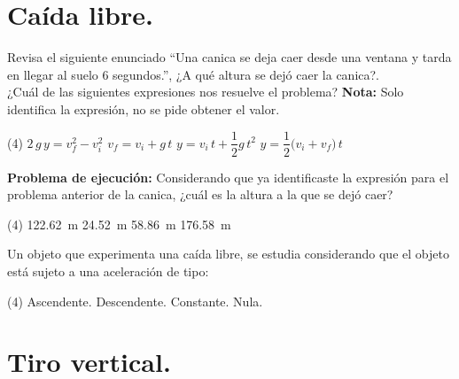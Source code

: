 \documentclass[12pt, letter]{exam}
\begin{document}
\begin{questions}
    \section{Caída libre.}
    
    \question Revisa el siguiente enunciado \enquote{Una canica se deja caer desde una ventana y tarda en llegar al suelo \num{6} segundos.}, ¿A qué altura se dejó caer la canica?. 
    \\
    ¿Cuál de las siguientes expresiones nos resuelve el problema? \textbf{Nota: } Solo identifica la expresión, no se pide obtener el valor.
    \begin{tasks}(4)
        \task $2 \, g \, y = v_{f}^{2} - v_{i}^{2}$
        \task $v_{f} = v_{i} + g \, t$
        \task $y = v_{i} \, t + \dfrac{1}{2} g \, t^{2}$
        \task $y = \dfrac{1}{2} \big( v_{i} + v_{f} \big) \, t$
    \end{tasks}
    \question \label{Problema_02} \textbf{Problema de ejecución:} Considerando que ya identificaste la expresión para el problema anterior de la canica, ¿cuál es la altura a la que se dejó caer?
    \begin{tasks}(4)
        \task \SI{122.62}{\meter}
        \task \SI{24.52}{\meter}
        \task \SI{58.86}{\meter}
        \task \SI{176.58}{\meter}
    \end{tasks}
    \question Un objeto que experimenta una caída libre, se estudia considerando que el objeto está sujeto a una aceleración de tipo:
    \begin{tasks}(4)
        \task Ascendente.
        \task Descendente.
        \task Constante.
        \task Nula.
    \end{tasks}

    \newpage

    \section{Tiro vertical.}


\end{questions}
\end{document}
